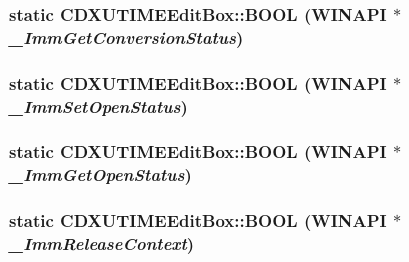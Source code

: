 \label{class_c_d_x_u_t_i_m_e_edit_box_a92caced3bb5c9e6169fb6ad258fb5f5e}
\hypertarget{class_c_d_x_u_t_i_m_e_edit_box_a3ba80e837a90d59f621fdd1bbca61a98}{
\subsubsection[{BOOL}]{\setlength{\rightskip}{0pt plus 5cm}static {\bf CDXUTIMEEditBox::BOOL} (WINAPI $\ast$ {\em \_\-ImmGetConversionStatus})}}
\label{class_c_d_x_u_t_i_m_e_edit_box_a3ba80e837a90d59f621fdd1bbca61a98}
\hypertarget{class_c_d_x_u_t_i_m_e_edit_box_abf576cfdcf09229db4caefc448285a7e}{
\subsubsection[{BOOL}]{\setlength{\rightskip}{0pt plus 5cm}static {\bf CDXUTIMEEditBox::BOOL} (WINAPI $\ast$ {\em \_\-ImmSetOpenStatus})}}
\label{class_c_d_x_u_t_i_m_e_edit_box_abf576cfdcf09229db4caefc448285a7e}
\hypertarget{class_c_d_x_u_t_i_m_e_edit_box_a5041919da19236ee4c67984b6f784789}{
\subsubsection[{BOOL}]{\setlength{\rightskip}{0pt plus 5cm}static {\bf CDXUTIMEEditBox::BOOL} (WINAPI $\ast$ {\em \_\-ImmGetOpenStatus})}}
\label{class_c_d_x_u_t_i_m_e_edit_box_a5041919da19236ee4c67984b6f784789}
\hypertarget{class_c_d_x_u_t_i_m_e_edit_box_ab1828ba67744482b0aec50deb5f9ddaf}{
\subsubsection[{BOOL}]{\setlength{\rightskip}{0pt plus 5cm}static {\bf CDXUTIMEEditBox::BOOL} (WINAPI $\ast$ {\em \_\-ImmReleaseContext})}}
